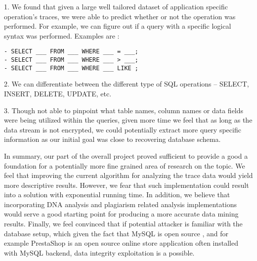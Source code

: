 \documentclass[11pt,a4paper, titlepage, oneside]{article}
\begin{document}
1. We found that given a large well tailored dataset of application specific operation's traces, we were able to predict whether or not the operation was performed. For example, we can figure out if a query with a specific logical syntax was performed. Examples are :
\begin{verbatim}
- SELECT ___ FROM ___ WHERE ___ = ___; 
- SELECT ___ FROM ___ WHERE ___ > ___;
- SELECT ___ FROM ___ WHERE ___ LIKE ;
\end{verbatim}
2. We can differentiate between the different type of SQL operations – SELECT, INSERT, DELETE, UPDATE, etc.
      
3. Though not able to pinpoint what table names, column names or data fields were being utilized within the queries, given more time we feel that as long as the data stream is not encrypted, we could potentially extract more query specific information as our initial goal was close to recovering database schema.

In summary, our part of the overall project proved sufficient to provide a good a foundation for a potentially more fine grained area of research on the topic. We feel that improving the current algorithm for analyzing the trace data would yield more descriptive results. However, we fear that such implementation could result into a solution with exponential running time. In addition, we believe that incorporating DNA analysis and plagiarism related analysis implementations would serve a good starting point for producing a more accurate data mining results. Finally, we feel convinced that if potential attacker is familiar with the database setup, which given the fact that MySQL is open source , and for example PrestaShop is an open source online store application often installed with MySQL backend, data integrity exploitation is a possible.
\end{document}
